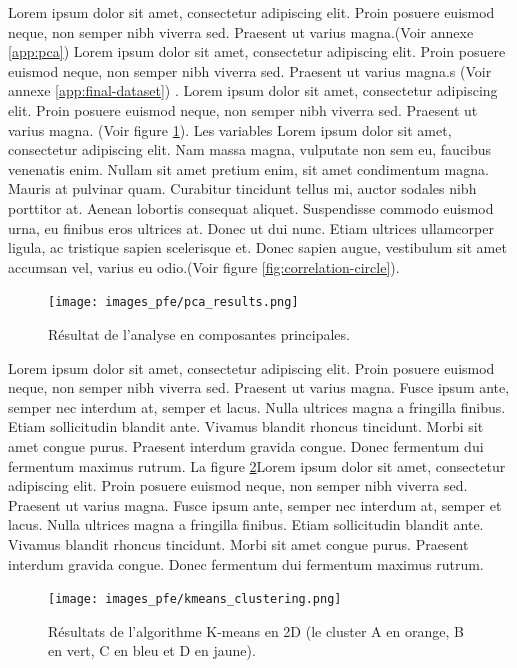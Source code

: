 Lorem ipsum dolor sit amet, consectetur adipiscing elit. Proin posuere euismod neque, non semper nibh viverra sed. Praesent ut varius magna.(Voir annexe \ref{app:pca}) Lorem ipsum dolor sit amet, consectetur adipiscing elit. Proin posuere euismod neque, non semper nibh viverra sed. Praesent ut varius magna.s (Voir annexe \ref{app:final-dataset}) . Lorem ipsum dolor sit amet, consectetur adipiscing elit. Proin posuere euismod neque, non semper nibh viverra sed. Praesent ut varius magna. (Voir figure \ref{fig:pca-method}). Les variables Lorem ipsum dolor sit amet, consectetur adipiscing elit. Nam massa magna, vulputate non sem eu, faucibus venenatis enim. Nullam sit amet pretium enim, sit amet condimentum magna. Mauris at pulvinar quam. Curabitur tincidunt tellus mi, auctor sodales nibh porttitor at. Aenean lobortis consequat aliquet. Suspendisse commodo euismod urna, eu finibus eros ultrices at. Donec ut dui nunc. Etiam ultrices ullamcorper ligula, ac tristique sapien scelerisque et. Donec sapien augue, vestibulum sit amet accumsan vel, varius eu odio.(Voir figure \ref{fig:correlation-circle}).

\begin{figure}[hbt!]
  \centering
  \texttt{[image: images\_pfe/pca\_results.png]}
  \caption{Résultat de l'analyse en composantes principales.}
  \label{fig:pca-method}
\end{figure}
\FloatBarrier

Lorem ipsum dolor sit amet, consectetur adipiscing elit. Proin posuere euismod neque, non semper nibh viverra sed. Praesent ut varius magna. Fusce ipsum ante, semper nec interdum at, semper et lacus. Nulla ultrices magna a fringilla finibus. Etiam sollicitudin blandit ante. Vivamus blandit rhoncus tincidunt. Morbi sit amet congue purus. Praesent interdum gravida congue. Donec fermentum dui fermentum maximus rutrum. La figure \ref{fig:kmeans-pca}Lorem ipsum dolor sit amet, consectetur adipiscing elit. Proin posuere euismod neque, non semper nibh viverra sed. Praesent ut varius magna. Fusce ipsum ante, semper nec interdum at, semper et lacus. Nulla ultrices magna a fringilla finibus. Etiam sollicitudin blandit ante. Vivamus blandit rhoncus tincidunt. Morbi sit amet congue purus. Praesent interdum gravida congue. Donec fermentum dui fermentum maximus rutrum.

\begin{figure}[hbt!]
  \centering
  \texttt{[image: images\_pfe/kmeans\_clustering.png]}
  \caption{Résultats de l'algorithme K-means en 2D (le cluster A en orange, B en vert, C en bleu et D en jaune).}
  \label{fig:kmeans-pca}
\end{figure}
\FloatBarrier

